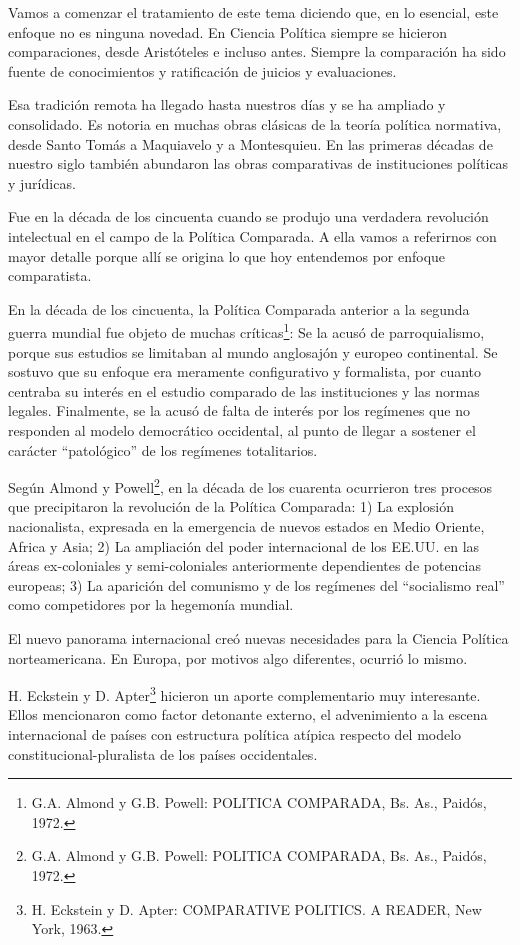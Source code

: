 \documentclass[
]{book}
\begin{document}
Vamos a comenzar el tratamiento de este tema diciendo que, en lo esencial, este enfoque no es ninguna novedad. En Ciencia Política siempre se hicieron comparaciones, desde Aristóteles e incluso antes. Siempre la comparación ha sido fuente de conocimientos y ratificación de juicios y evaluaciones.

Esa tradición remota ha llegado hasta nuestros días y se ha ampliado y consolidado. Es notoria en muchas obras clásicas de la teoría política normativa, desde Santo Tomás a Maquiavelo y a Montesquieu. En las primeras décadas de nuestro siglo también abundaron las obras comparativas de instituciones políticas y jurídicas.

Fue en la década de los cincuenta cuando se produjo una verdadera revolución intelectual en el campo de la Política Comparada. A ella vamos a referirnos con mayor detalle porque allí se origina lo que hoy entendemos por enfoque comparatista.

En la década de los cincuenta, la Política Comparada anterior a la segunda guerra mundial fue objeto de muchas críticas\footnote{G.A. Almond y G.B. Powell: POLITICA COMPARADA, Bs. As., Paidós, 1972.}: Se la acusó de parroquialismo, porque sus estudios se limitaban al mundo anglosajón y europeo continental. Se sostuvo que su enfoque era meramente configurativo y formalista, por cuanto centraba su interés en el estudio comparado de las instituciones y las normas legales. Finalmente, se la acusó de falta de interés por los regímenes que no responden al modelo democrático occidental, al punto de llegar a sostener el carácter ``patológico'' de los regímenes totalitarios.

Según Almond y Powell\footnote{G.A. Almond y G.B. Powell: POLITICA COMPARADA, Bs. As., Paidós, 1972.}, en la década de los cuarenta ocurrieron tres procesos que precipitaron la revolución de la Política Comparada: 1) La explosión nacionalista, expresada en la emergencia de nuevos estados en Medio Oriente, Africa y Asia; 2) La ampliación del poder internacional de los EE.UU. en las áreas ex-coloniales y semi-coloniales anteriormente dependientes de potencias europeas; 3) La aparición del comunismo y de los regímenes del ``socialismo real'' como competidores por la hegemonía mundial.

El nuevo panorama internacional creó nuevas necesidades para la Ciencia Política norteamericana. En Europa, por motivos algo diferentes, ocurrió lo mismo.

H. Eckstein y D. Apter\footnote{H. Eckstein y D. Apter: COMPARATIVE POLITICS. A READER, New York, 1963.} hicieron un aporte complementario muy interesante. Ellos mencionaron como factor detonante externo, el advenimiento a la escena internacional de países con estructura política atípica respecto del modelo constitucional-pluralista de los países occidentales.
\end{document}
